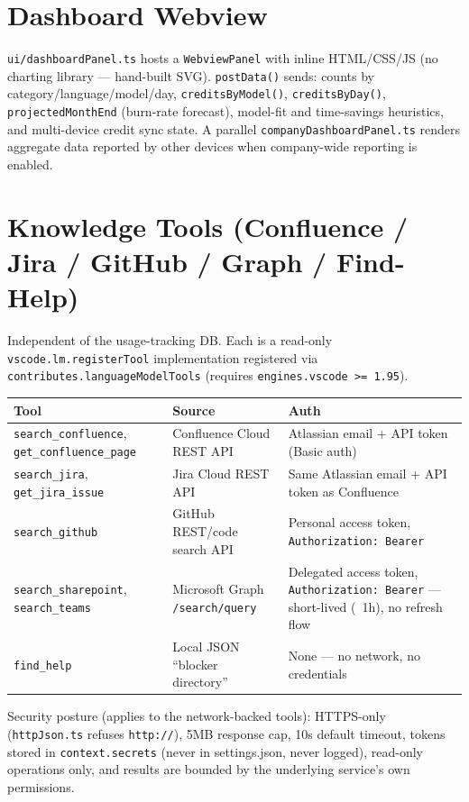 \documentclass[11pt,a4paper]{article}
\newcommand{\code}[1]{\texttt{\color{lloydsblue!80!black}#1}}
\begin{document}
\section{Dashboard Webview}

\code{ui/dashboardPanel.ts} hosts a \code{WebviewPanel} with inline
HTML/CSS/JS (no charting library --- hand-built SVG). \code{postData()}
sends: counts by category/language/model/day, \code{creditsByModel()},
\code{creditsByDay()}, \code{projectedMonthEnd} (burn-rate forecast),
model-fit and time-savings heuristics, and multi-device credit sync state.
A parallel \code{companyDashboardPanel.ts} renders aggregate data reported
by other devices when company-wide reporting is enabled.

\section{Knowledge Tools (Confluence / Jira / GitHub / Graph / Find-Help)}

Independent of the usage-tracking DB. Each is a read-only
\code{vscode.lm.registerTool} implementation registered via
\code{contributes.languageModelTools} (requires \code{engines.vscode >= 1.95}).

\begin{longtable}{@{}p{3.6cm}p{6.2cm}p{5.2cm}@{}}
\toprule
\textbf{Tool} & \textbf{Source} & \textbf{Auth} \\
\midrule
\endhead
\code{search\_confluence}, \code{get\_confluence\_page} & Confluence Cloud REST API & Atlassian email + API token (Basic auth) \\
\code{search\_jira}, \code{get\_jira\_issue} & Jira Cloud REST API & Same Atlassian email + API token as Confluence \\
\code{search\_github} & GitHub REST/code search API & Personal access token, \code{Authorization: Bearer} \\
\code{search\_sharepoint}, \code{search\_teams} & Microsoft Graph \code{/search/query} & Delegated access token, \code{Authorization: Bearer} --- short-lived (~1h), no refresh flow \\
\code{find\_help} & Local JSON ``blocker directory'' & None --- no network, no credentials \\
\bottomrule
\end{longtable}

Security posture (applies to the network-backed tools): HTTPS-only
(\code{httpJson.ts} refuses \code{http://}), 5MB response cap, 10s default
timeout, tokens stored in \code{context.secrets} (never in settings.json,
never logged), read-only operations only, and results are bounded by the
underlying service's own permissions.
\end{document}
